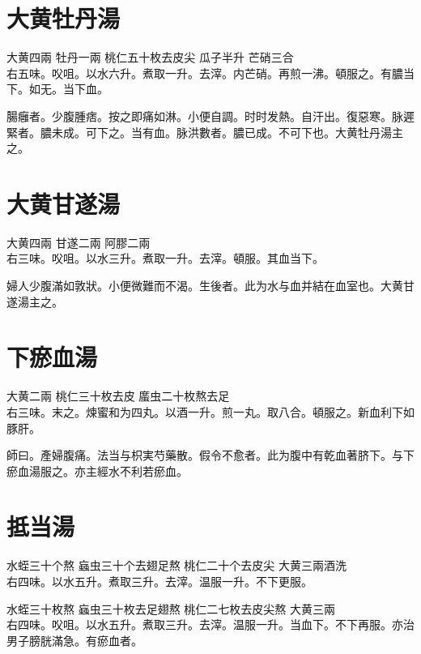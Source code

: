 \section{大黄牡丹湯}

大黄{\scriptsize 四兩} 牡丹{\scriptsize 一兩} 桃仁{\scriptsize 五十枚去皮尖} 瓜子{\scriptsize 半升} 芒硝{\scriptsize 三合}\\
右五味。㕮咀。以水六升。煮取一升。去滓。内芒硝。再煎一沸。頓服之。有膿当下。如无。当下血。

腸癰者。少腹腫痞。按之即痛如淋。小便自調。时时发熱。自汗出。復惡寒。脉遲緊者。膿未成。可下之。当有血。脉洪數者。膿已成。不可下也。大黄牡丹湯主之。

\section{大黄甘遂湯}

大黄{\scriptsize 四兩} 甘遂{\scriptsize 二兩} 阿膠{\scriptsize 二兩}\\
右三味。㕮咀。以水三升。煮取一升。去滓。頓服。其血当下。

婦人少腹滿如敦狀。小便微難而不渴。生後者。此为水与血并結在血室也。大黄甘遂湯主之。

\section{下瘀血湯}

大黄{\scriptsize 二兩} 桃仁{\scriptsize 三十枚去皮} 䗪虫{\scriptsize 二十枚熬去足}\\
右三味。末之。煉蜜和为四丸。以酒一升。煎一丸。取八合。頓服之。新血利下如豚肝。

師曰。產婦腹痛。法当与枳実芍藥散。假令不愈者。此为腹中有乾血著脐下。与下瘀血湯服之。{\khaai 亦}主經水不利若瘀血。

\section{抵当湯}

水蛭{\scriptsize 三十个熬} 蝱虫{\scriptsize 三十个去翅足熬} 桃仁{\scriptsize 二十个去皮尖} 大黄{\scriptsize 三兩酒洗}\\
右四味。以水五升。煮取三升。去滓。温服一升。不下更服。{\zhaoben}

水蛭{\scriptsize 三十枚熬} 蝱虫{\scriptsize 三十枚去足翅熬} 桃仁{\scriptsize 二七枚去皮尖熬} 大黄{\scriptsize 三兩}\\
右四味。㕮咀。以水五升。煮取三升。去滓。温服一升。当血下。不下再服。亦治男子膀胱滿急。有瘀血者。{\wuben}

